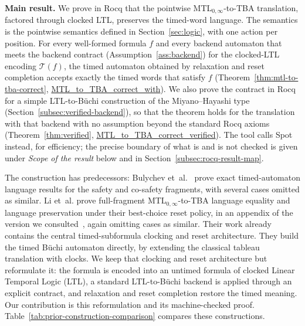 \documentclass[manuscript]{acmart}
\newcommand{\T}{\mathcal{T}}
\newcommand{\runinhead}[1]{\par\noindent\textbf{#1}\enspace}
\newcommand{\Rocqid}[1]{\url{#1}}
\begin{document}
\runinhead{Main result.} We prove in Rocq that the pointwise
MTL$_{0,\infty}$-to-TBA translation, factored
through clocked LTL, preserves the timed-word language. The semantics is the
pointwise semantics defined in Section~\ref{sec:logic}, with one action per
position. For every well-formed
formula $f$ and every backend automaton that meets the backend contract
(Assumption~\ref{ass:backend}) for the clocked-LTL encoding $\T(f)$, the timed
automaton obtained by relaxation and reset completion accepts exactly the timed
words that satisfy $f$ (Theorem~\ref{thm:mtl-to-tba-correct},
\Rocqid{MTL_to_TBA_correct_with}). We also prove the contract in Rocq for a
simple LTL-to-B\"uchi construction of the Miyano--Hayashi type
(Section~\ref{subsec:verified-backend}), so that the theorem holds for the
translation with that backend with no assumption beyond the standard Rocq
axioms (Theorem~\ref{thm:verified}, \Rocqid{MTL_to_TBA_correct_verified}). The
tool calls Spot instead, for efficiency; the precise boundary of what is and is
not checked is given under \emph{Scope of the result} below and in
Section~\ref{subsec:rocq-result-map}.

The construction has predecessors: Bulychev et~al.~\cite{BDLG14} prove exact timed-automaton language results for the safety
and co-safety fragments, with several cases omitted as similar. Li et~al. prove
full-fragment MTL$_{0,\infty}$-to-TBA language equality and language
preservation under their best-choice reset policy, in an appendix of the
version we consulted~\cite{li_spin7}, again omitting cases as similar. Their
work already contains the central timed-subformula clocking and reset
architecture. They build the timed B\"uchi automaton directly, by extending the
classical tableau translation with clocks. We keep that clocking and reset
architecture but reformulate it: the formula is encoded into an untimed formula of clocked Linear Temporal Logic (LTL), a standard LTL-to-B\"uchi backend is applied through an
explicit contract, and relaxation and reset completion restore the timed
meaning. Our contribution is this reformulation and its machine-checked proof.
Table~\ref{tab:prior-construction-comparison} compares these
constructions.
\end{document}
